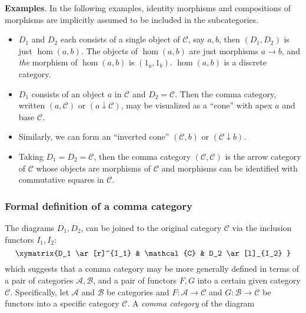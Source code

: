 \documentclass[12pt]{article}
\begin{document}
\textbf{Examples}.  In the following examples, identity morphisms and compositions of morphisms are implicitly assumed to be included in the subcategories.
\begin{itemize}
\item $D_1$ and $D_2$ each consists of a single object of $\mathcal{C}$, say $a,b$, then $(D_1,D_2)$ is just $\hom(a,b)$.  The objects of $\hom(a,b)$ are just morphisms $a\to b$, and \emph{the} morphism of $\hom(a,b)$ is $(1_a,1_b)$.  $\hom(a,b)$ is a discrete category.
\item $D_1$ consists of an object $a$ in $\mathcal{C}$ and $D_2= \mathcal{C}$.  Then the comma category, written $(a,\mathcal{C})$ or $(a\downarrow \mathcal{C})$, may be visualized as a ``cone'' with apex $a$ and base $\mathcal{C}$.
\item Similarly, we can form an ``inverted cone'' $(\mathcal{C},b)$ or $(\mathcal{C}\downarrow b)$.
\item Taking $D_1=D_2=\mathcal{C}$, then the comma category $(\mathcal{C}, \mathcal{C})$ is the arrow category of $\mathcal{C}$ whose objects are morphisms of $\mathcal{C}$ and morphisms can be identified with commutative squares in $\mathcal{C}$.
\end{itemize}

\subsubsection*{Formal definition of a comma category}
The diagrams $D_1,D_2$, can be joined to the original category $\mathcal{C}$ via the inclusion functors $I_1,I_2$:
\[
\xymatrix{D_1 \ar[r]^{I_1} & \mathcal{C} & D_2 \ar[l]_{I_2} }
\]
which suggests that a comma category may be more generally defined in terms of a pair of categories $\mathcal{A},\mathcal{B}$, and a pair of functors $F,G$ into a certain given category $\mathcal{C}$.  Specifically, let $\mathcal{A}$ and $\mathcal{B}$ be categories and $F: \mathcal{A}\to \mathcal{C}$ and $G:\mathcal{B}\to \mathcal{C}$ be functors into a specific category $\mathcal{C}$.  A \emph{comma category} of the diagram 
\end{document}
